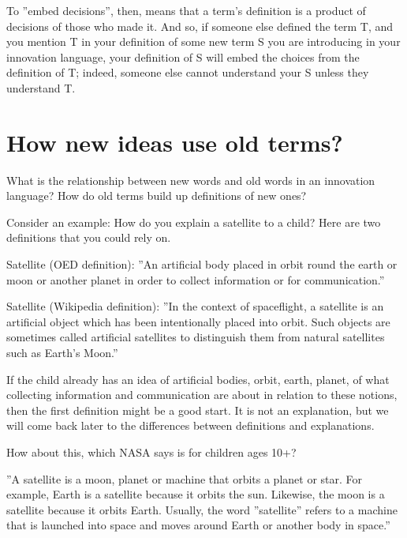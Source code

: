To ''embed decisions'', then, means that a term's definition is a product of decisions of those who made it. And so, if someone else defined the term T, and you mention T in your definition of some new term S you are introducing in your innovation language, your definition of S will embed the choices from the definition of T; indeed, someone else cannot understand your S unless they understand T.

\section{How new ideas use old terms?}
\label{c6:s2}
What is the relationship between new words and old words in an innovation language? How do old terms build up definitions of new ones?

Consider an example: How do you explain a satellite to a child? Here are two definitions that you could rely on.

\begin{svgraybox}
Satellite (OED definition): ''An artificial body placed in orbit round the earth or moon or another planet in order to collect information or for communication.'' \cite{def-satellite}
\end{svgraybox}

\begin{svgraybox}
Satellite (Wikipedia definition): ''In the context of spaceflight, a satellite is an artificial object which has been intentionally placed into orbit. Such objects are sometimes called artificial satellites to distinguish them from natural satellites such as Earth's Moon.'' \cite{wikipedia-satellite}
\end{svgraybox}

If the child already has an idea of artificial bodies, orbit, earth, planet, of what collecting information and communication are about in relation to these notions, then the first definition might be a good start. It is not an explanation, but we will come back later to the differences between definitions and explanations.

How about this, which NASA says is for children ages 10+?

\begin{svgraybox}
''A satellite is a moon, planet or machine that orbits a planet or star. For example, Earth is a satellite because it orbits the sun. Likewise, the moon is a satellite because it orbits Earth. Usually, the word ''satellite'' refers to a machine that is launched into space and moves around Earth or another body in space.'' \cite{nasa-satellite-58}
\end{svgraybox}

